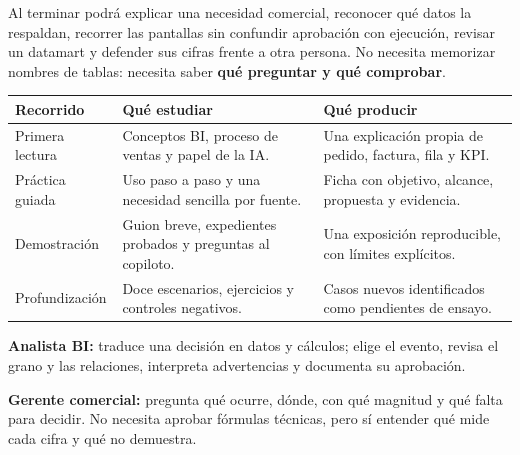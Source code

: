 Al terminar podrá explicar una necesidad comercial, reconocer qué datos la respaldan, recorrer las pantallas sin confundir aprobación con ejecución, revisar un datamart y defender sus cifras frente a otra persona. No necesita memorizar nombres de tablas: necesita saber \textbf{qué preguntar y qué comprobar}.
\begin{tabularx}{\linewidth}{@{}p{31mm}YY@{}}
\toprule
\textbf{Recorrido}&\textbf{Qué estudiar}&\textbf{Qué producir}\\
\midrule
Primera lectura&Conceptos BI, proceso de ventas y papel de la IA.&Una explicación propia de pedido, factura, fila y KPI.\\
Práctica guiada&Uso paso a paso y una necesidad sencilla por fuente.&Ficha con objetivo, alcance, propuesta y evidencia.\\
Demostración&Guion breve, expedientes probados y preguntas al copiloto.&Una exposición reproducible, con límites explícitos.\\
Profundización&Doce escenarios, ejercicios y controles negativos.&Casos nuevos identificados como pendientes de ensayo.\\
\bottomrule
\end{tabularx}
\textbf{Analista BI:} traduce una decisión en datos y cálculos; elige el evento, revisa el grano y las relaciones, interpreta advertencias y documenta su aprobación.

\textbf{Gerente comercial:} pregunta qué ocurre, dónde, con qué magnitud y qué falta para decidir. No necesita aprobar fórmulas técnicas, pero sí entender qué mide cada cifra y qué no demuestra.

